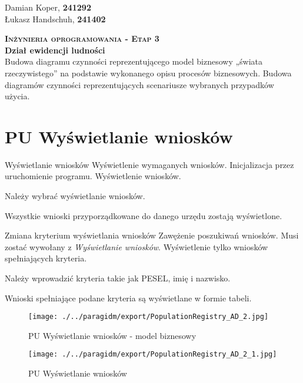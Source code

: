\documentclass[12pt]{article}
\begin{document}
\begin{flushleft}
        Damian Koper, \textbf{241292} \\
        Łukasz Handschuh, \textbf{241402}
\end{flushleft}
\vspace{1cm}
{
    \centering
    {\Huge\scshape\bfseries Inżynieria oprogramowania - Etap 3 }\\
    \vspace{0.25cm}
    \Large\textbf{Dział ewidencji ludności} \\
    \vspace{0.25cm}
    \large Budowa diagramu czynności reprezentującego model
    biznesowy „świata rzeczywistego” na podstawie
    wykonanego opisu procesów biznesowych. Budowa
    diagramów czynności reprezentujących scenariusze
    wybranych przypadków użycia.\\
}

\section{PU Wyświetlanie wniosków}
\scenario
    {Wyświetlanie wniosków}
    {Wyświetlenie wymaganych wniosków.}
    {Inicjalizacja przez uruchomienie programu.}
    {Wyświetlenie wniosków.}
    {
        \item Należy wybrać wyświetlanie wniosków.
        \item Wszystkie wnioski przyporządkowane do danego urzędu zostają wyświetlone.
    }
\scenario
    {Zmiana kryterium wyświetlania wniosków}
    {Zawężenie poszukiwań wniosków.}
    {Musi zostać wywołany z \textit{Wyświetlanie wniosków}.}
    {Wyświetlenie tylko wniosków spełniających kryteria.}
    {
        \item Należy wprowadzić kryteria takie jak PESEL, imię i nazwisko.
        \item Wnioski spełniające podane kryteria są wyświetlane w formie tabeli.
    }

    \begin{sidewaysfigure}[!h]
        \centering
        \texttt{[image: ./../paragidm/export/PopulationRegistry\_AD\_2.jpg]}
        \caption{PU Wyświetlanie wniosków - model biznesowy}
        \label{}
    \end{sidewaysfigure}

    \begin{sidewaysfigure}[!h]
        \centering
        \texttt{[image: ./../paragidm/export/PopulationRegistry\_AD\_2\_1.jpg]}
        \caption{PU Wyświetlanie wniosków}
        \label{}
    \end{sidewaysfigure}
\end{document}
